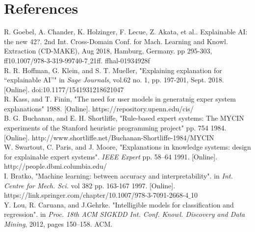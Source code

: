 \documentclass[12]{article}
\begin{document}
\newpage
\section*{References}
%
\renewcommand{\section}[2]{}%
\begin{thebibliography}{1}
\singlespacing


 R. Goebel, A. Chander, K. Holzinger, F. Lecue, Z. Akata, et al.. Explainable AI: the new 42?. 2nd Int. Cross-Domain Conf. for Mach. Learning and Knowl. Extraction (CD-MAKE), Aug 2018, Hamburg, Germany. pp 295-303, ff10.1007/978-3-319-99740-7$\_$21ff. ffhal-01934928f \\


   R. R. Hoffman, G. Klein, and S. T. Mueller, "Explaining explanation for “explainable AI”" in  \textit{Sage Journals}, vol.62 no. 1, pp. 197-201, Sept. 2018. [Online]. doi:10.1177/1541931218621047\\
  
     R. Kass, and T. Finin, "The need for user models in generatnig exper system explanations" 1988. [Online]. https://repository.upenn.edu/cis/\\

     B. G. Buchanan, and E. H. Shortliffe, "Rule-based expert systems:
The MYCIN experiments of the Stanford heuristic programming project" pp. 754 1984. [Online]. http://www.shortliffe.net/Buchanan-Shortliffe-1984/MYCIN\\


     W. Swartout, C. Paris, and J. Moore, "Explanations in knowledge systems: design for explainable expert systems".  \textit{IEEE Expert} pp. 58–64 1991. [Online]. http://people.dbmi.columbia.edu/\\

     I. Bratko, "Machine learning: between accuracy and interpretability". in \textit{Int. Centre for Mech. Sci.} vol 382 pp. 163-167 1997. [Online]. https://link.springer.com/chapter/10.1007/978-3-7091-2668-4$\_$10\\



 Y. Lou, R. Caruana, and J.Gehrke. "Intelligible models for classification and regression". in  \textit{Proc. 18th ACM SIGKDD Int. Conf.  Knowl. Discovery and Data Mining}, 2012, pages 150–158. ACM.


\end{thebibliography}
\end{document}
